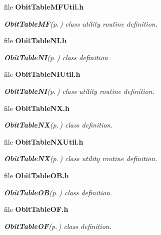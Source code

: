 \begin{CompactItemize}
\item 
file {\bf Obit\-Table\-MFUtil.h}
\begin{CompactList}\small\item\em {\bf Obit\-Table\-MF}{\rm (p.\,\pageref{structObitTableMF})} class utility routine definition. \item\end{CompactList}

\item 
file {\bf Obit\-Table\-NI.h}
\begin{CompactList}\small\item\em {\bf Obit\-Table\-NI}{\rm (p.\,\pageref{structObitTableNI})} class definition. \item\end{CompactList}

\item 
file {\bf Obit\-Table\-NIUtil.h}
\begin{CompactList}\small\item\em {\bf Obit\-Table\-NI}{\rm (p.\,\pageref{structObitTableNI})} class utility routine definition. \item\end{CompactList}

\item 
file {\bf Obit\-Table\-NX.h}
\begin{CompactList}\small\item\em {\bf Obit\-Table\-NX}{\rm (p.\,\pageref{structObitTableNX})} class definition. \item\end{CompactList}

\item 
file {\bf Obit\-Table\-NXUtil.h}
\begin{CompactList}\small\item\em {\bf Obit\-Table\-NX}{\rm (p.\,\pageref{structObitTableNX})} class utility routine definition. \item\end{CompactList}

\item 
file {\bf Obit\-Table\-OB.h}
\begin{CompactList}\small\item\em {\bf Obit\-Table\-OB}{\rm (p.\,\pageref{structObitTableOB})} class definition. \item\end{CompactList}

\item 
file {\bf Obit\-Table\-OF.h}
\begin{CompactList}\small\item\em {\bf Obit\-Table\-OF}{\rm (p.\,\pageref{structObitTableOF})} class definition. \item\end{CompactList}


\end{CompactItemize}
